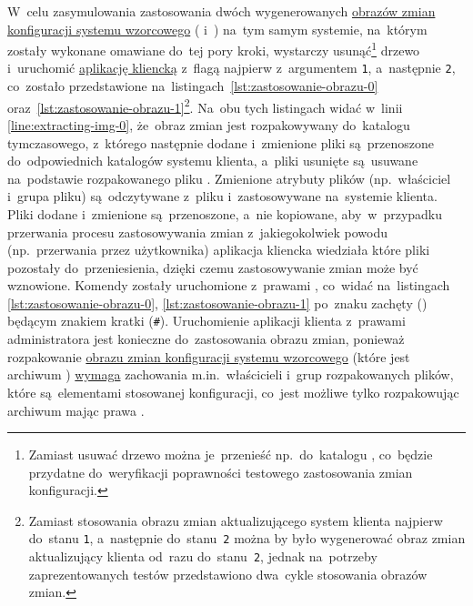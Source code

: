 \documentclass[thesis]{subfiles}
\begin{document}
W~celu zasymulowania zastosowania dwóch wygenerowanych \hyperref[sec:obraz-zmian-konfiguracji]{obrazów zmian konfiguracji systemu wzorcowego} ( i~) na~tym samym systemie, na~którym zostały wykonane omawiane do~tej pory kroki, wystarczy usunąć\footnote{Zamiast usuwać drzewo  można je~przenieść np.~do~katalogu , co~będzie przydatne do~weryfikacji poprawności testowego zastosowania zmian konfiguracji.} drzewo  i~uruchomić \hyperref[sec:cli-app]{aplikację kliencką} z~flagą  najpierw z~argumentem \texttt{1}, a~następnie \texttt{2}, co~zostało przedstawione na~listingach~\ref{lst:zastosowanie-obrazu-0} oraz~\ref{lst:zastosowanie-obrazu-1}\footnote{Zamiast stosowania obrazu zmian aktualizującego system klienta najpierw do~stanu \texttt{1}, a~następnie do~stanu~\texttt{2} można by było wygenerować obraz zmian aktualizujący klienta od~razu do~stanu~\texttt{2}, jednak na~potrzeby zaprezentowanych testów przedstawiono dwa~cykle stosowania obrazów zmian.}. Na~obu tych listingach widać w~linii \ref{line:extracting-img-0}, że~obraz zmian jest rozpakowywany do~katalogu tymczasowego, z~którego następnie dodane i~zmienione pliki są~przenoszone do~odpowiednich katalogów systemu klienta, a~pliki usunięte są~usuwane na~podstawie rozpakowanego pliku . Zmienione atrybuty plików (np.~właściciel i~grupa pliku) są~odczytywane z~pliku  i~zastosowywane na~systemie klienta. Pliki dodane i~zmienione są~przenoszone, a~nie kopiowane, aby~w~przypadku przerwania procesu zastosowywania zmian z~jakiegokolwiek powodu (np.~przerwania przez użytkownika) aplikacja kliencka wiedziała które pliki pozostały do~przeniesienia, dzięki czemu zastosowywanie zmian może być wznowione. Komendy  zostały uruchomione z~prawami \superuser{}, co~widać na~listingach \ref{lst:zastosowanie-obrazu-0}, \ref{lst:zastosowanie-obrazu-1} po~znaku zachęty () będącym znakiem kratki (\texttt{\#}). Uruchomienie aplikacji klienta z~prawami administratora jest konieczne do~zastosowania obrazu zmian, ponieważ rozpakowanie \hyperref[sec:obraz-zmian-konfiguracji]{obrazu zmian konfiguracji systemu wzorcowego} (które jest archiwum \targz{}) \href{https://superuser.com/questions/838392/how-to-tar-a-directory-preserving-not-only-permissions-but-ownership-too}{wymaga} zachowania m.in.~właścicieli i~grup rozpakowanych plików, które są~elementami stosowanej konfiguracji, co~jest możliwe tylko rozpakowując archiwum mając prawa \superuser{}.
\end{document}
